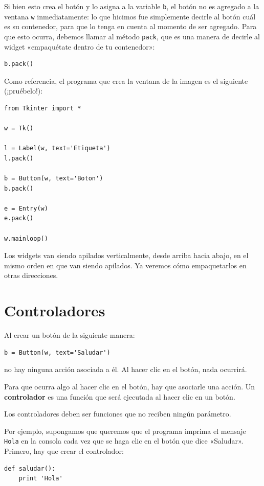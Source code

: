 Si bien esto crea el botón y lo asigna a la variable \lstinline!b!, el
botón no es agregado a la ventana \lstinline!w! inmediatamente: lo que
hicimos fue simplemente decirle al botón cuál es su contenedor, para que
lo tenga en cuenta al momento de ser agregado. Para que esto ocurra,
debemos llamar al método \lstinline!pack!, que es una manera de decirle
al widget «empaquétate dentro de tu contenedor»:

\begin{lstlisting}
b.pack()
\end{lstlisting}

Como referencia, el programa que crea la ventana de la imagen es el
siguiente (¡pruébelo!):
\begin{lstlisting}
from Tkinter import *

w = Tk()

l = Label(w, text='Etiqueta')
l.pack()

b = Button(w, text='Boton')
b.pack()

e = Entry(w)
e.pack()

w.mainloop()
\end{lstlisting}



Los widgets van siendo apilados verticalmente, desde arriba hacia abajo,
en el mismo orden en que van siendo apilados. Ya veremos cómo
empaquetarlos en otras direcciones.

\section{Controladores}

Al crear un botón de la siguiente manera:
\begin{lstlisting}
b = Button(w, text='Saludar')
\end{lstlisting}
no hay ninguna acción asociada a él. Al hacer clic en el botón, nada
ocurrirá.

Para que ocurra algo al hacer clic en el botón, hay que asociarle una
acción. Un \textbf{controlador} es una función que será ejecutada al
hacer clic en un botón.

Los controladores deben ser funciones que no reciben ningún parámetro.

Por ejemplo, supongamos que queremos que el programa imprima el mensaje
\lstinline!Hola! en la consola cada vez que se haga clic en el botón que
dice «Saludar». Primero, hay que crear el controlador:
\begin{lstlisting}
def saludar():
    print 'Hola'
\end{lstlisting}

